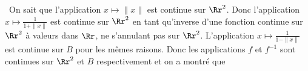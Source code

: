 {{\textbullet~On sait que l'application $x\mapsto\|x\|$ est continue sur $\Rr^2$. Donc l'application $x\mapsto \frac{1}{1+\|x\|}$ est continue sur $\Rr^2$ en tant qu'inverse d'une fonction continue sur $\Rr^2$ à valeurs dans $\Rr$, ne s'annulant pas sur $\Rr^2$. L'application $x\mapsto \frac{1}{1-\|x\|}$ est continue sur $B$ pour les mêmes raisons. Donc les applications $f$ et $f^{-1}$ sont continues sur $\Rr^2$ et $B$ respectivement et on a montré que

\begin{center}
\end{center}
}
}
